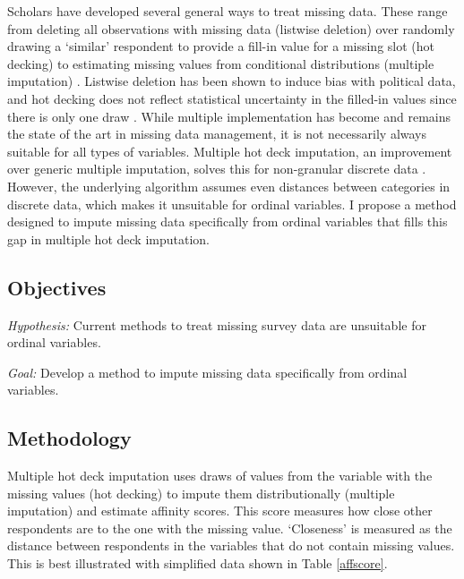 \documentclass[11pt]{article}
\begin{document}
Scholars have developed several general ways to treat missing data. These range from deleting all observations with missing data (listwise deletion) over randomly drawing a `similar' respondent to provide a fill-in value for a missing slot (hot decking) to estimating missing values from conditional distributions (multiple imputation) \citep{rubin_1976_inference,king_2001_analyzing,fay_1996_alternative}. Listwise deletion has been shown to induce bias with political data, and hot decking does not reflect statistical uncertainty in the filled-in values since there is only one draw \citep{kroh_2006_taking,gill_2013_bayesian,rees_1997_methods}. While multiple implementation has become and remains the state of the art in missing data management, it is not necessarily always suitable for all types of variables. Multiple hot deck imputation, an improvement over generic multiple imputation, solves this for non-granular discrete data \citep{gill_2012_have, reilly_1993_data}. However, the underlying algorithm assumes even distances between categories in discrete data, which makes it unsuitable for ordinal variables. I propose a method designed to impute missing data specifically from ordinal variables that fills this gap in multiple hot deck imputation. 




\subsection{Objectives}

\textit{Hypothesis:} Current methods to treat missing survey data are unsuitable for ordinal variables. \par 
\noindent \textit{Goal:} Develop a method to impute missing data specifically from ordinal variables.


\subsection{Methodology}

Multiple hot deck imputation uses draws of values from the variable with the missing values (hot decking) to impute them distributionally (multiple imputation) and estimate affinity scores. This score measures how close other respondents are to the one with the missing value. `Closeness' is measured as the distance between respondents in the variables that do not contain missing values. This is best illustrated with simplified data shown in Table \ref{affscore}.
\end{document}
